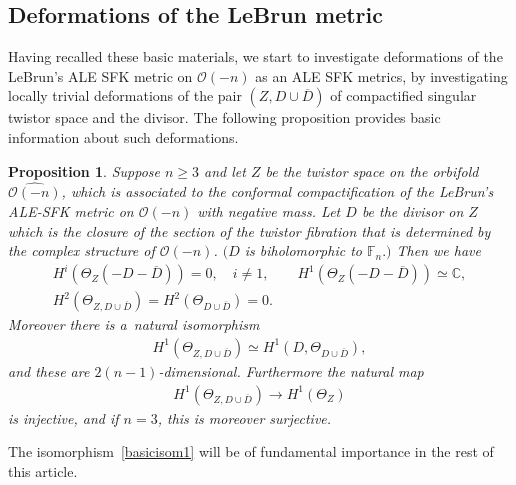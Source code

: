 \documentclass[11pt]{article}
\numberwithin{equation}{section}
\newtheorem{Proposition}[Theorem]{Proposition}
{\theoremstyle{definition}
\newtheorem{Definition}[Theorem]{Definition}
\newtheorem{Remark}[Theorem]{Remark}
}
\begin{document}
\subsection{Deformations of the LeBrun metric}
\label{ss:DLm}

Having recalled these basic materials, we start to investigate deformations of the LeBrun's ALE SFK metric on $\mathscr
O(-n)$ as an ALE SFK metrics, by investigating locally trivial deformations of the pair $(Z,D\cup\overline D)$ of
compactif\/ied singular twistor space and the divisor.
The following proposition provides basic information about such deformations.
\begin{Proposition}\label{prop:isom1}
Suppose $n\ge 3$ and let $Z$ be the twistor space on the orbifold $\widehat{\mathscr O(-n)}$, which is associated to the
conformal compactification of the LeBrun's ALE-SFK metric on $\mathscr O(-n)$ with negative mass.
Let $D$ be the divisor on $Z$ which is the closure of the section of the twistor fibration that is determined by the
complex structure of $\mathscr O(-n)$.
$(D$ is biholomorphic to $\mathbb{F}_n.)$ Then we have
\begin{gather}
\label{cohomdim1}
H^i( \Theta_Z(-D-\overline D) ) = 0,
\quad
i\neq 1,
\qquad
H^1( \Theta_Z(-D-\overline D) ) \simeq \mathbb{C},
\\
H^2(\Theta_{Z, D\cup\overline D}) = H^2 ( \Theta_{D\cup \overline D} ) = 0.
\label{van1}
\end{gather}
Moreover there is a~natural isomorphism
\begin{gather}
\label{basicisom1}
H^1 (\Theta_{Z,  D \cup \overline D} ) \simeq H^1 (D, \Theta_{ D \cup \overline D} ),
\end{gather}
and these are $2(n-1)$-dimensional.
Furthermore the natural map
\begin{gather}
\label{forget}
H^1(\Theta_{Z,D\cup\overline D})
\longrightarrow
H^1(\Theta_Z)
\end{gather}
is injective, and if $n=3$, this is moreover surjective.
\end{Proposition}

The isomorphism~\eqref{basicisom1} will be of fundamental importance in the rest of this article.
\end{document}
